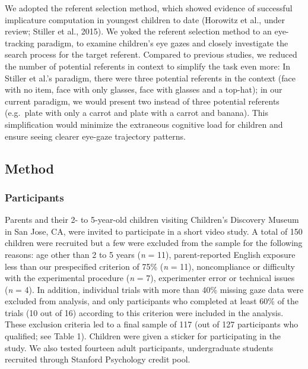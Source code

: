 \documentclass[a4paper,man,apacite,floatsintext]{apa6}
\begin{document}
We adopted the referent selection method, which showed evidence of
successful implicature computation in youngest children to date
(Horowitz et al., under review; Stiller et al., 2015). We yoked the
referent selection method to an eye-tracking paradigm, to examine
children's eye gazes and closely investigate the search process for the
target referent. Compared to previous studies, we reduced the number of
potential referents in context to simplify the task even more: In
Stiller et al.'s paradigm, there were three potential referents in the
context (face with no item, face with only glasses, face with glasses
and a top-hat); in our current paradigm, we would present two instead of
three potential referents (e.g.~plate with only a carrot and plate with
a carrot and banana). This simplification would minimize the extraneous
cognitive load for children and ensure seeing clearer eye-gaze
trajectory patterns.

\subsection{Method}\label{method}

\subsubsection{Participants}\label{participants}

Parents and their 2- to 5-year-old children visiting Children's
Discovery Museum in San Jose, CA, were invited to participate in a short
video study. A total of 150 children were recruited but a few were
excluded from the sample for the following reasons: age other than 2 to
5 years (\emph{n} = 11), parent-reported English exposure less than our
prespecified criterion of 75\% (\emph{n} = 11), noncompliance or
difficulty with the experimental procedure (\emph{n} = 7), experimenter
error or technical issues (\emph{n} = 4). In addition, individual trials
with more than 40\% missing gaze data were excluded from analysis, and
only participants who completed at least 60\% of the trials (10 out of
16) according to this criterion were included in the analysis. These
exclusion criteria led to a final sample of 117 (out of 127 participants
who qualified; see Table 1). Children were given a sticker for
participating in the study. We also tested fourteen adult participants,
undergraduate students recruited through Stanford Psychology credit
pool.
\end{document}
